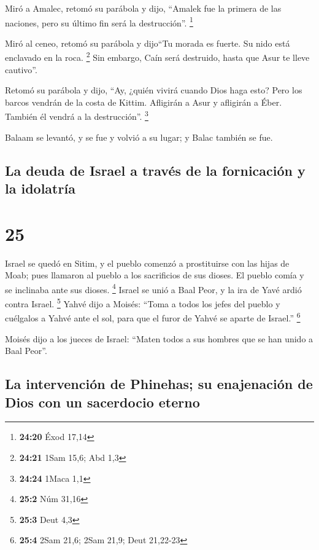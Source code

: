  Miró a Amalec, retomó su parábola y dijo, ``Amalek fue
la primera de las naciones, pero su último fin será la destrucción''.
\footnote{\textbf{24:20} Éxod 17,14}

 Miró al ceneo, retomó su parábola y dijo``Tu morada es
fuerte. Su nido está enclavado en la roca. \footnote{\textbf{24:21} 1Sam
  15,6; Abd 1,3}  Sin embargo, Caín será destruido, hasta
que Asur te lleve cautivo''.

 Retomó su parábola y dijo, ``Ay, ¿quién vivirá cuando
Dios haga esto?  Pero los barcos vendrán de la costa de
Kittim. Afligirán a Asur y afligirán a Éber. También él vendrá a la
destrucción''. \footnote{\textbf{24:24} 1Maca 1,1}

 Balaam se levantó, y se fue y volvió a su lugar; y Balac
también se fue.

\hypertarget{la-deuda-de-israel-a-travuxe9s-de-la-fornicaciuxf3n-y-la-idolatruxeda}{%
\subsection{La deuda de Israel a través de la fornicación y la
idolatría}\label{la-deuda-de-israel-a-travuxe9s-de-la-fornicaciuxf3n-y-la-idolatruxeda}}

\hypertarget{section-24}{%
\section{25}\label{section-24}}

 Israel se quedó en Sitim, y el pueblo comenzó a
prostituirse con las hijas de Moab;  pues llamaron al
pueblo a los sacrificios de sus dioses. El pueblo comía y se inclinaba
ante sus dioses. \footnote{\textbf{25:2} Núm 31,16} 
Israel se unió a Baal Peor, y la ira de Yavé ardió contra Israel.
\footnote{\textbf{25:3} Deut 4,3}  Yahvé dijo a Moisés:
``Toma a todos los jefes del pueblo y cuélgalos a Yahvé ante el sol,
para que el furor de Yahvé se aparte de Israel.'' \footnote{\textbf{25:4}
  2Sam 21,6; 2Sam 21,9; Deut 21,22-23}

 Moisés dijo a los jueces de Israel: ``Maten todos a sus
hombres que se han unido a Baal Peor''.

\hypertarget{la-intervenciuxf3n-de-phinehas-su-enajenaciuxf3n-de-dios-con-un-sacerdocio-eterno}{%
\subsection{La intervención de Phinehas; su enajenación de Dios con un
sacerdocio
eterno}\label{la-intervenciuxf3n-de-phinehas-su-enajenaciuxf3n-de-dios-con-un-sacerdocio-eterno}}

